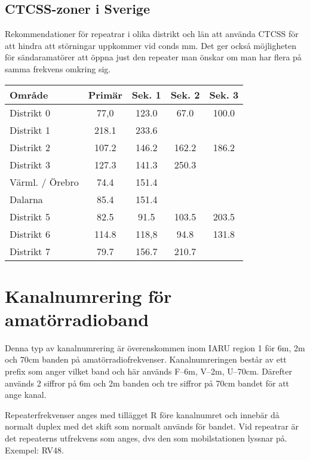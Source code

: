 \subsection{CTCSS-zoner i Sverige}

Rekommendationer för repeatrar i olika distrikt och län att använda CTCSS för att hindra att störningar uppkommer vid conds mm. Det ger också möjligheten för sändaramatörer att öppna just den repeater man önskar om man har flera på samma frekvens omkring sig.

\begin{longtable}{lcccc}
	\textbf{Område} & \textbf{Primär} & \textbf{Sek. 1} & \textbf{Sek. 2} & \textbf{Sek. 3} \\ \hline
	\endhead
	Distrikt 0      &      77,0       &      123.0      &      67.0       &      100.0      \\
	Distrikt 1      &      218.1      &      233.6      &                 &  \\
	Distrikt 2      &      107.2      &      146.2      &      162.2      &      186.2      \\
	Distrikt 3      &      127.3      &      141.3      &      250.3      &  \\
	Värml. / Örebro &      74.4       &      151.4      &                 &  \\
	Dalarna         &      85.4       &      151.4      &                 &  \\
	Distrikt 5      &      82.5       &      91.5       &      103.5      &      203.5      \\
	Distrikt 6      &      114.8      &      118,8      &      94.8       &      131.8      \\
	Distrikt 7      &      79.7       &      156.7      &      210.7      &
\end{longtable}

\section{Kanalnumrering för amatörradioband}

Denna typ av kanalnumrering är överenskommen inom IARU region 1 för 6m, 2m och 70cm banden på amatörradiofrekvenser. Kanalnumreringen består av ett prefix som anger vilket band och här används F--6m, V--2m, U--70cm. Därefter används 2 siffror på 6m och 2m banden och tre siffror på 70cm bandet för att ange kanal. 

Repeaterfrekvenser anges med tillägget R före kanalnumret och innebär då normalt duplex med det skift som normalt används för bandet. Vid repeatrar är det repeaterns utfrekvens som anges, dvs den som mobilstationen lyssnar på. Exempel: RV48.

